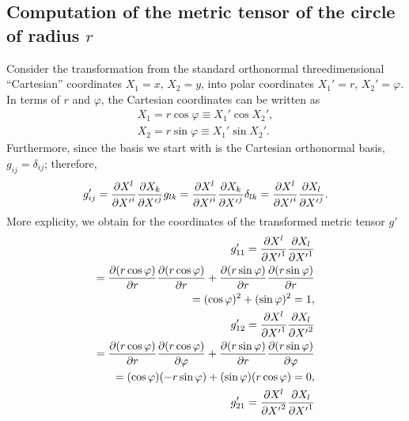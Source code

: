 {
\color{blue}
\bexample

\subsection*{Computation of the metric tensor of the circle of radius $r$}
Consider the transformation from the standard orthonormal
threedimensional ``Cartesian'' coordinates
$X_1=x$,
$X_2=y$,
into polar coordinates
$X_1'=r$,
$X_2'=\varphi$.
In terms of  $r$ and $\varphi$, the Cartesian coordinates can be written as
\begin{equation}
\begin{split}
 X_1=r \cos \varphi \equiv X_1' \cos X_2'  , \\
 X_2=r \sin \varphi \equiv X_1'\sin X_2'  .
\end{split}
\end{equation}
Furthermore,  since the basis we start with is the Cartesian orthonormal basis,
$g_{ij}=\delta_{ij}$; therefore,
\begin{equation}
g'_{ij}= {\partial {X}^l\over \partial {X'}^i}{\partial {X}_k\over \partial {X'}^j} g_{lk}
= {\partial {X}^l\over \partial {X'}^i}{\partial {X}_k\over \partial {X'}^j} \delta_{lk}
= {\partial {X}^l\over \partial {X'}^i}{\partial {X}_l\over \partial {X'}^j}.
\end{equation}
More explicity, we obtain for the coordinates of the transformed metric tensor $g'$
\begin{equation}
\begin{split}
g'_{11}
= {\partial {X}^l\over \partial {X'}^1}{\partial {X}_l\over \partial {X'}^1} \\
=
{\partial (r \cos \varphi) \over \partial {r}}{\partial (r \cos \varphi) \over \partial {r}}
+
{\partial (r \sin \varphi) \over \partial {r}}{\partial (r \sin \varphi) \over \partial {r}}       \\
=
( \cos \varphi )^2
+
(\sin \varphi )^2 =1,\\
g'_{12}
= {\partial {X}^l\over \partial {X'}^1}{\partial {X}_l\over \partial {X'}^2} \\
=
{\partial (r \cos \varphi) \over \partial {r}}{\partial (r \cos \varphi) \over \partial {\varphi }}
+
{\partial (r \sin \varphi) \over \partial {r}}{\partial (r \sin \varphi) \over \partial {\varphi }}  \\
=
(\cos \varphi ) (- r \sin \varphi )
+
(\sin \varphi )( r \cos \varphi )  =0,\\
g'_{21}
= {\partial {X}^l\over \partial {X'}^2}{\partial {X}_l\over \partial {X'}^1} \\

\end{split}
\end{equation}}
